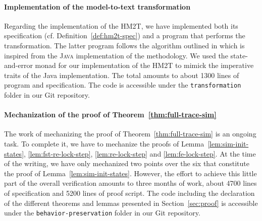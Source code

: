 \documentclass[pdflatex,sn-mathphys]{sn-jnl}%
\theoremstyle{thmstyleone}%
\theoremstyle{thmstyletwo}%
\theoremstyle{thmstylethree}%
\begin{document}
\paragraph{Implementation of the \hilecop{} model-to-text transformation}

% 
%

Regarding the \coq{} implementation of the HM2T, we have implemented
both its specification (cf. Definition~\ref{def:hm2t-spec}) and a
program that performs the transformation. The latter program follows
the algorithm outlined in \cite{Iampietro2021} which is inspired from
the \textsc{Java} implementation of the \hilecop{} methodology. We
used the state-and-error monad for our \coq{} implementation of the
HM2T to mimick the imperative traits of the \textsf{Java}
implementation. The total amounts to about 1300 lines of program and
specification. The code is accessible under the
\texttt{transformation} folder in our \textsf{Git} repository.

\paragraph{Mechanization of the proof of
  Theorem~\ref{thm:full-trace-sim}}

% 
%

The work of mechanizing the proof of Theorem~\ref{thm:full-trace-sim}
is an ongoing task. To complete it, we have to mechanize the proofs of
Lemma~\ref{lem:sim-init-states}, \ref{lem:fst-re-lock-step},
\ref{lem:re-lock-step} and \ref{lem:fe-lock-step}. At the time of the
writing, we have only mechanized two points over the six that
constitute the proof of Lemma~\ref{lem:sim-init-states}. However, the
effort to achieve this little part of the overall verification amounts
to three months of work, about 4700 lines of specification and 5200
lines of proof script. The code including the declaration of the
different theorems and lemmas presented in Section~\ref{sec:proof} is
accessible under the \texttt{behavior-preservation} folder in our
\textsf{Git} repository.

\bigskip
\end{document}
